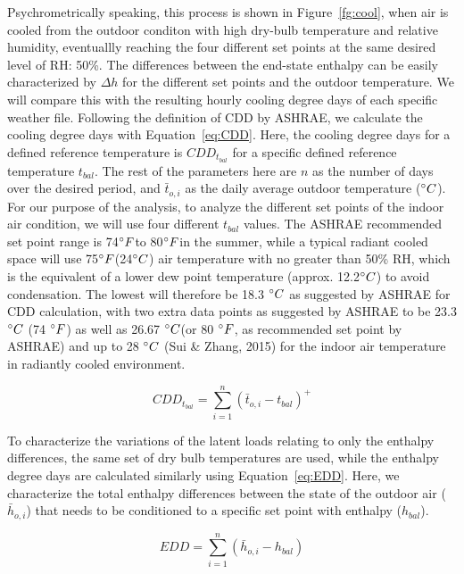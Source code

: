     Psychrometrically speaking, this process is shown in Figure~\ref{fg:cool}, when air is cooled from the outdoor conditon with high dry-bulb temperature and relative humidity, eventuallly reaching the four different set points at the same desired level of RH: 50\%. The differences between the end-state enthalpy can be easily characterized by $\Delta h$ for the different set points and the outdoor temperature. We will compare this with the resulting hourly cooling degree days of each specific weather file. Following the definition of CDD by ASHRAE, we calculate the cooling degree days with Equation~\ref{eq:CDD}. Here, the cooling degree days for a defined reference temperature is $CDD_{t_{bal}}$ for a specific defined reference temperature $t_{bal}$. The rest of the parameters here are $n$ as the number of days over the desired period, and $\bar t_{o,i}$ as the daily average outdoor temperature ($\degree C$). For our purpose of the analysis, to analyze the different set points of the indoor air condition, we will use four different $t_{bal}$ values. The ASHRAE recommended set point range is 74$\degree F$to 80$\degree F$in the summer, while a typical radiant cooled space will use 75$\degree F$(24$\degree C$) air temperature with no greater than 50\% RH, which is the equivalent of a lower dew point temperature (approx. 12.2$\degree C$) to avoid condensation\cite{american_society_of_heating_2007_2007}.  The lowest will therefore be 18.3 $\degree C$ as suggested by ASHRAE for CDD calculation, with two extra data points as suggested by ASHRAE to be 23.3 $\degree C$ (74 $\degree F$) as well as 26.67 $\degree C$(or 80 $\degree F$, as recommended set point by ASHRAE) and up to 28 $\degree C$ (Sui \& Zhang, 2015) for the indoor air temperature in radiantly cooled environment. 

    \begin{equation}
    CDD_{t_{bal}} = \sum_{i=1}^n (\bar t_{o,i}-t_{bal})^{+}\label{eq:CDD}
    \end{equation} 

    To characterize the variations of the latent loads relating to only the enthalpy differences, the same set of dry bulb temperatures are used, while the enthalpy degree days are calculated similarly using Equation~\ref{eq:EDD}. Here, we characterize the total enthalpy differences between the state of the outdoor air ($\bar h_{o,i}$) that needs to be conditioned to a specific set point with enthalpy ($h_{bal}$). 

    \begin{equation}
    EDD = \sum^n_{i=1}(\bar h_{o,i}-h_{bal})\label{eq:EDD}
    \end{equation}

